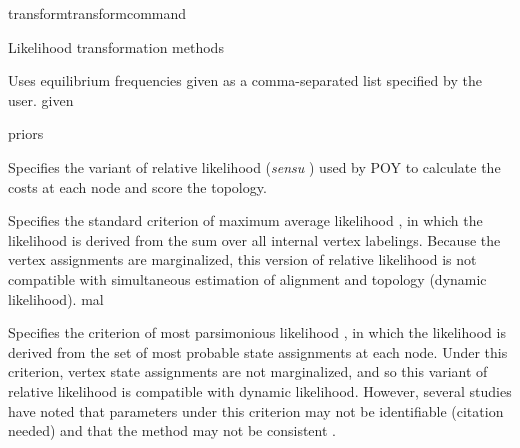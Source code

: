\begin{command}{transform}{transformcommand}
\begin{arguments}
\begin{argumentgroup}{Likelihood transformation methods}
{\begin{description}
                            {Uses equilibrium frequencies given as a
                            comma-separated list specified by the user.}
                            {given}

                    \end{description}}
                {priors}

                    {Specifies the variant of relative likelihood (\textit{sensu}
                    \cite{steel2000parsimony}) used by POY to calculate the costs at
                    each node and score the topology.

                    \begin{description}

                            {Specifies the standard criterion of maximum average
                            likelihood \cite{felsenstein1981}, in which the
                            likelihood is derived from the sum over all internal
                            vertex labelings. Because the vertex assignments are
                            marginalized, this version of relative likelihood is not
                            compatible with simultaneous estimation of alignment and
                            topology (dynamic likelihood).}
                            {mal}

                            {Specifies the criterion of most parsimonious likelihood
                            \cite{barryandhartigan1987}, in which the likelihood is
                            derived from the set of most probable state assignments
                            at each node. Under this criterion, vertex state
                            assignments are not marginalized, and so this variant of
                            relative likelihood is compatible with dynamic
                            likelihood. However, several studies have noted that
                            parameters under this criterion may not be identifiable
                            (citation needed) and that the method may not be consistent
                            \cite[for example]{mossel2009shrinkage}.
                            
}
\end{description}}
\end{argumentgroup}
\end{arguments}
\end{command}
